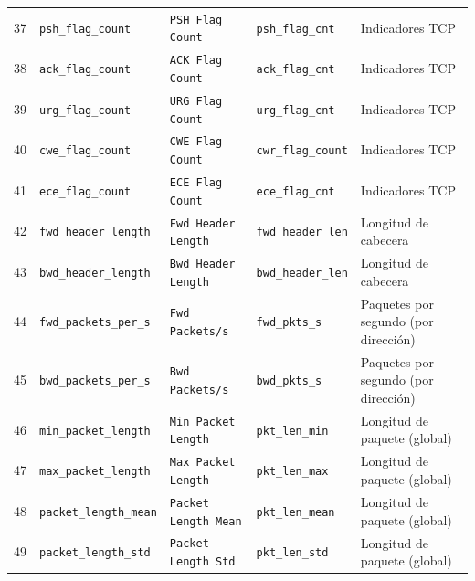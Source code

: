 \begin{landscape}
\begin{longtable}{@{}r p{4.2cm} p{4.4cm} p{4.1cm} p{4.8cm}@{}}
37 & \texttt{psh\_\allowbreak{}flag\_\allowbreak{}count} & \texttt{PSH Flag Count} & \texttt{psh\_\allowbreak{}flag\_\allowbreak{}cnt} & Indicadores TCP \\
38 & \texttt{ack\_\allowbreak{}flag\_\allowbreak{}count} & \texttt{ACK Flag Count} & \texttt{ack\_\allowbreak{}flag\_\allowbreak{}cnt} & Indicadores TCP \\
39 & \texttt{urg\_\allowbreak{}flag\_\allowbreak{}count} & \texttt{URG Flag Count} & \texttt{urg\_\allowbreak{}flag\_\allowbreak{}cnt} & Indicadores TCP \\
40 & \texttt{cwe\_\allowbreak{}flag\_\allowbreak{}count} & \texttt{CWE Flag Count} & \texttt{cwr\_\allowbreak{}flag\_\allowbreak{}count} & Indicadores TCP \\
41 & \texttt{ece\_\allowbreak{}flag\_\allowbreak{}count} & \texttt{ECE Flag Count} & \texttt{ece\_\allowbreak{}flag\_\allowbreak{}cnt} & Indicadores TCP \\
42 & \texttt{fwd\_\allowbreak{}header\_\allowbreak{}length} & \texttt{Fwd Header Length} & \texttt{fwd\_\allowbreak{}header\_\allowbreak{}len} & Longitud de cabecera \\
43 & \texttt{bwd\_\allowbreak{}header\_\allowbreak{}length} & \texttt{Bwd Header Length} & \texttt{bwd\_\allowbreak{}header\_\allowbreak{}len} & Longitud de cabecera \\
44 & \texttt{fwd\_\allowbreak{}packets\_\allowbreak{}per\_\allowbreak{}s} & \texttt{Fwd Packets/s} & \texttt{fwd\_\allowbreak{}pkts\_\allowbreak{}s} & Paquetes por segundo (por dirección) \\
45 & \texttt{bwd\_\allowbreak{}packets\_\allowbreak{}per\_\allowbreak{}s} & \texttt{Bwd Packets/s} & \texttt{bwd\_\allowbreak{}pkts\_\allowbreak{}s} & Paquetes por segundo (por dirección) \\
46 & \texttt{min\_\allowbreak{}packet\_\allowbreak{}length} & \texttt{Min Packet Length} & \texttt{pkt\_\allowbreak{}len\_\allowbreak{}min} & Longitud de paquete (global) \\
47 & \texttt{max\_\allowbreak{}packet\_\allowbreak{}length} & \texttt{Max Packet Length} & \texttt{pkt\_\allowbreak{}len\_\allowbreak{}max} & Longitud de paquete (global) \\
48 & \texttt{packet\_\allowbreak{}length\_\allowbreak{}mean} & \texttt{Packet Length Mean} & \texttt{pkt\_\allowbreak{}len\_\allowbreak{}mean} & Longitud de paquete (global) \\
49 & \texttt{packet\_\allowbreak{}length\_\allowbreak{}std} & \texttt{Packet Length Std} & \texttt{pkt\_\allowbreak{}len\_\allowbreak{}std} & Longitud de paquete (global) \\

\end{longtable}
\end{landscape}
